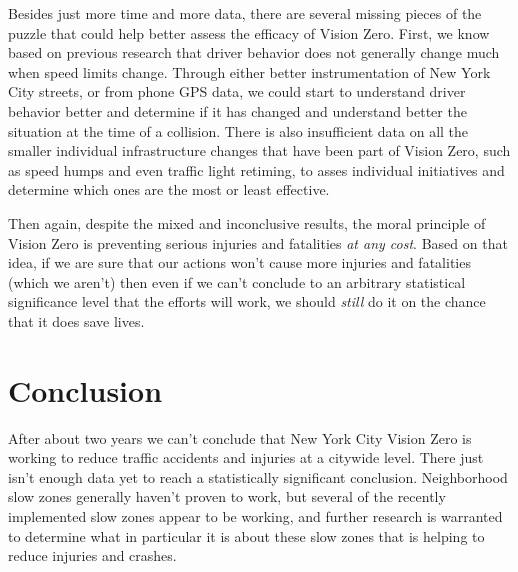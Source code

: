 \documentclass[10pt,journal,compsoc]{IEEEtran}
\begin{document}
Besides just more time and more data, there are several missing pieces of the puzzle that could help better assess the efficacy of Vision Zero.  First, we know based on previous research that driver behavior does not generally change much when speed limits change.  Through either better instrumentation of New York City streets, or from phone GPS data, we could start to understand driver behavior better and determine if it has changed and understand better the situation at the time of a collision.  There is also insufficient data on all the smaller individual infrastructure changes that have been part of Vision Zero, such as speed humps and even traffic light retiming, to asses individual initiatives and determine which ones are the most or least effective.  

Then again, despite the mixed and inconclusive results, the moral principle of Vision Zero is preventing serious injuries and fatalities \textit{at any cost}.  Based on that idea, if we are sure that our actions won't cause more injuries and fatalities (which we aren't) then even if we can't conclude to an arbitrary statistical significance level that the efforts will work, we should \textit{still} do it on the chance that it does save lives.    

\section{Conclusion}
After about two years we can't conclude that New York City Vision Zero is working to reduce traffic accidents and injuries at a citywide level.  There just isn't enough data yet to reach a statistically significant conclusion.  Neighborhood slow zones generally haven't proven to work, but several of the recently implemented slow zones appear to be working, and further research is warranted to determine what in particular it is about these slow zones that is helping to reduce injuries and crashes. 



\appendices
\end{document}

